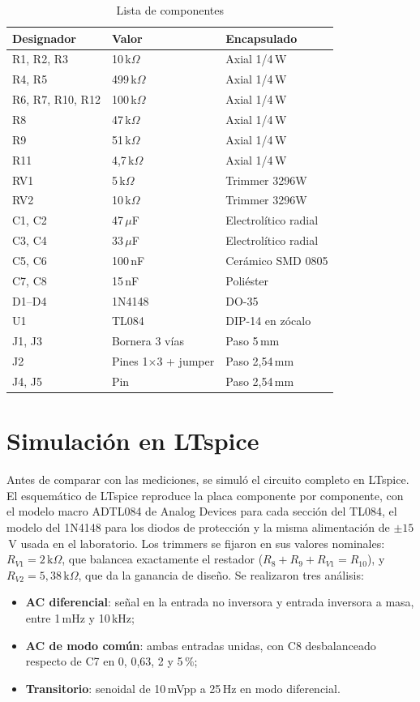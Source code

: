 \documentclass[journal,a4paper]{IEEEtran}
\begin{document}
\begin{table}[!t]
\centering
\caption{Lista de componentes}
\label{tab:bom}
\footnotesize
\begin{tabular}{@{}lll@{}}
\toprule
Designador & Valor & Encapsulado \\ \midrule
R1, R2, R3 & 10\,k$\Omega$ & Axial 1/4\,W \\
R4, R5 & 499\,k$\Omega$ & Axial 1/4\,W \\
R6, R7, R10, R12 & 100\,k$\Omega$ & Axial 1/4\,W \\
R8 & 47\,k$\Omega$ & Axial 1/4\,W \\
R9 & 51\,k$\Omega$ & Axial 1/4\,W \\
R11 & 4,7\,k$\Omega$ & Axial 1/4\,W \\
RV1 & 5\,k$\Omega$ & Trimmer 3296W \\
RV2 & 10\,k$\Omega$ & Trimmer 3296W \\
C1, C2 & 47\,$\mu$F & Electrolítico radial \\
C3, C4 & 33\,$\mu$F & Electrolítico radial \\
C5, C6 & 100\,nF & Cerámico SMD 0805 \\
C7, C8 & 15\,nF & Poliéster \\
D1--D4 & 1N4148 & DO-35 \\
U1 & TL084 & DIP-14 en zócalo \\
J1, J3 & Bornera 3 vías & Paso 5\,mm \\
J2 & Pines 1$\times$3 + jumper & Paso 2,54\,mm \\
J4, J5 & Pin & Paso 2,54\,mm \\ \bottomrule
\end{tabular}
\end{table}

\section{Simulación en LTspice}

Antes de comparar con las mediciones, se simuló el circuito completo en LTspice. El esquemático de LTspice reproduce la placa componente por componente, con el modelo macro ADTL084 de Analog Devices para cada sección del TL084, el modelo del 1N4148 para los diodos de protección y la misma alimentación de $\pm 15$\,V usada en el laboratorio. Los trimmers se fijaron en sus valores nominales: $R_{V1} = 2$\,k$\Omega$, que balancea exactamente el restador ($R_8+R_9+R_{V1} = R_{10}$), y $R_{V2} = 5{,}38$\,k$\Omega$, que da la ganancia de diseño. Se realizaron tres análisis:
\begin{itemize}
\item \textbf{AC diferencial}: señal en la entrada no inversora y entrada inversora a masa, entre 1\,mHz y 10\,kHz;
\item \textbf{AC de modo común}: ambas entradas unidas, con C8 desbalanceado respecto de C7 en 0, 0,63, 2 y 5\,\%;
\item \textbf{Transitorio}: senoidal de 10\,mVpp a 25\,Hz en modo diferencial.
\end{itemize}
\end{document}
